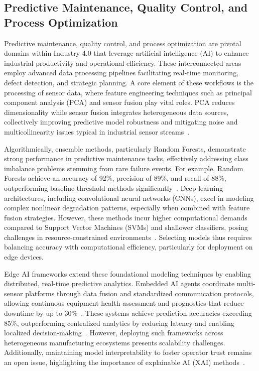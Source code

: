 \documentclass[sigconf]{acmart}
\begin{document}
\subsection{Predictive Maintenance, Quality Control, and Process Optimization}

Predictive maintenance, quality control, and process optimization are pivotal domains within Industry 4.0 that leverage artificial intelligence (AI) to enhance industrial productivity and operational efficiency. These interconnected areas employ advanced data processing pipelines facilitating real-time monitoring, defect detection, and strategic planning. A core element of these workflows is the processing of sensor data, where feature engineering techniques such as principal component analysis (PCA) and sensor fusion play vital roles. PCA reduces dimensionality while sensor fusion integrates heterogeneous data sources, collectively improving predictive model robustness and mitigating noise and multicollinearity issues typical in industrial sensor streams~\cite{ref30,ref33}.

Algorithmically, ensemble methods, particularly Random Forests, demonstrate strong performance in predictive maintenance tasks, effectively addressing class imbalance problems stemming from rare failure events. For example, Random Forests achieve an accuracy of 92\%, precision of 89\%, and recall of 88\%, outperforming baseline threshold methods significantly~\cite{ref29,ref24}. Deep learning architectures, including convolutional neural networks (CNNs), excel in modeling complex nonlinear degradation patterns, especially when combined with feature fusion strategies. However, these methods incur higher computational demands compared to Support Vector Machines (SVMs) and shallower classifiers, posing challenges in resource-constrained environments~\cite{ref24,ref32}. Selecting models thus requires balancing accuracy with computational efficiency, particularly for deployment on edge devices.

Edge AI frameworks extend these foundational modeling techniques by enabling distributed, real-time predictive analytics. Embedded AI agents coordinate multi-sensor platforms through data fusion and standardized communication protocols, allowing continuous equipment health assessment and prognostics that reduce downtime by up to 30\%~\cite{ref35,ref36}. These systems achieve prediction accuracies exceeding 85\%, outperforming centralized analytics by reducing latency and enabling localized decision-making~\cite{ref35}. However, deploying such frameworks across heterogeneous manufacturing ecosystems presents scalability challenges. Additionally, maintaining model interpretability to foster operator trust remains an open issue, highlighting the importance of explainable AI (XAI) methods~\cite{ref38}.
\end{document}
